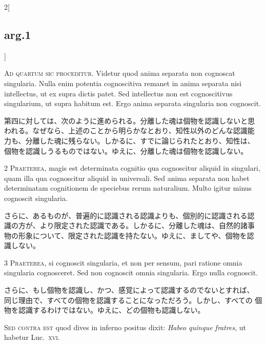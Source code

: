 \documentclass[paper=a4paper,fontsize=10pt,jafontsize=9pt,titlepage]{jlreq}
\begin{document}
\begin{paracol}{2}[\subsection{arg.1}]

{\huge A}{\scshape d quartum sic proceditur}. Videtur quod anima separata
non cognoscat singularia. Nulla enim potentia cognoscitiva remanet in
anima separata nisi intellectus, ut ex supra dictis patet. Sed
intellectus non est cognoscitivus singularium, ut supra habitum
est. Ergo anima separata singularia non cognoscit.

\switchcolumn

第四に対しては、次のように進められる。分離した魂は個物を認識しないと思
われる。なぜなら、上述のことから明らかなとおり、知性以外のどんな認識能
力も、分離した魂に残らない。しかるに、すでに論じられたとおり、知性は、
個物を認識しうるものではない。ゆえに、分離した魂は個物を認識しない。

\switchcolumn*

2 {\scshape Praeterea}, magis est determinata cognitio qua cognoscitur
aliquid in singulari, quam illa qua cognoscitur aliquid in
universali. Sed anima separata non habet determinatam cognitionem de
speciebus rerum naturalium. Multo igitur minus cognoscit singularia.

\switchcolumn

さらに、あるものが、普遍的に認識される認識よりも、個別的に認識される認
識の方が、より限定された認識である。しかるに、分離した魂は、自然的諸事
物の形象について、限定された認識を持たない。ゆえに、ましてや、個物を認
識しない。

\switchcolumn*

3 {\scshape Praeterea}, si cognoscit singularia, et non per sensum, pari
ratione omnia singularia cognosceret. Sed non cognoscit omnia
singularia. Ergo nulla cognoscit.

\switchcolumn

さらに、もし個物を認識し、かつ、感覚によって認識するのでないとすれば、
同じ理由で、すべての個物を認識することになっただろう。しかし、すべての
個物を認識するわけではない。ゆえに、どの個物も認識しない。

\switchcolumn*[\subsection{s.c.}]

{\scshape Sed contra est} quod dives in inferno positus dixit: {\itshape Habeo
quinque fratres}, ut habetur Luc.~{\scshape xvi}.


\end{paracol}
\end{document}
